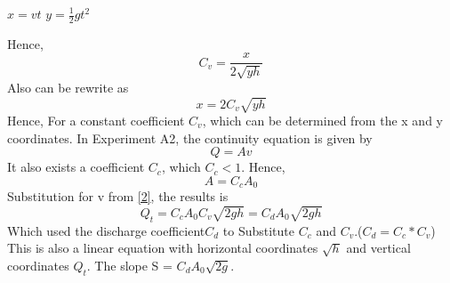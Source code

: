 $ x=vt$ $y=\frac{1}{2}gt^2$

Hence,
\begin{equation}
    C_v=\frac{x}{2\sqrt{yh}}
    \label{5}
\end{equation}
Also can be rewrite as
\begin{equation}
    x=2C_v\sqrt{yh}
    \label{6}
\end{equation}
Hence, For a constant coefficient $C_v$, which can be determined from the x and y coordinates.
In Experiment A2, the continuity equation is given by
\begin{equation}
\label{velocity}
Q=Av
\end{equation}
It also exists a coefficient $C_c$, which $C_c < 1$. Hence,
\begin{equation}
    \label{11}
    A=C_cA_0
\end{equation}
Substitution for v from \eqref{2}, the results is
\begin{equation}
    \label{13}
    Q_t=C_cA_0C_v\sqrt{2gh}=C_dA_0\sqrt{2gh}
\end{equation}
Which used the discharge coefficient$C_d$ to Substitute $C_c$ and $C_v$.($C_d=C_c*C_v$)
This is also a linear equation with horizontal 
coordinates $\sqrt{h}$ and vertical coordinates $Q_t$. The slope S =
$C_dA_0\sqrt{2g}$.


